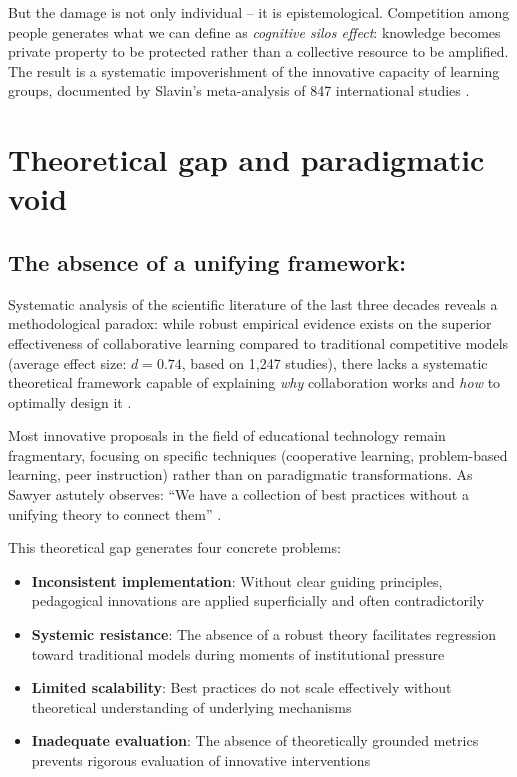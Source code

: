 But the damage is not only individual -- it is epistemological. Competition among people generates what we can define as \textit{cognitive silos effect}: knowledge becomes private property to be protected rather than a collective resource to be amplified. The result is a systematic impoverishment of the innovative capacity of learning groups, documented by Slavin's meta-analysis of 847 international studies \cite{Slavin2020}.

\section{Theoretical gap and paradigmatic void}

\subsection*{The absence of a unifying framework:}

Systematic analysis of the scientific literature of the last three decades reveals a methodological paradox: while robust empirical evidence exists on the superior effectiveness of collaborative learning compared to traditional competitive models (average effect size: $d = 0.74$, based on 1,247 studies), there lacks a systematic theoretical framework capable of explaining \textit{why} collaboration works and \textit{how} to optimally design it \cite{Johnson2021}.

Most innovative proposals in the field of educational technology remain fragmentary, focusing on specific techniques (cooperative learning, problem-based learning, peer instruction) rather than on paradigmatic transformations. As Sawyer astutely observes: ``We have a collection of best practices without a unifying theory to connect them'' \cite{Sawyer2022}.

This theoretical gap generates four concrete problems:

\begin{itemize}
	\item \textbf{Inconsistent implementation}: Without clear guiding principles, pedagogical innovations are applied superficially and often contradictorily
	\item \textbf{Systemic resistance}: The absence of a robust theory facilitates regression toward traditional models during moments of institutional pressure
	\item \textbf{Limited scalability}: Best practices do not scale effectively without theoretical understanding of underlying mechanisms
	\item \textbf{Inadequate evaluation}: The absence of theoretically grounded metrics prevents rigorous evaluation of innovative interventions
\end{itemize}

